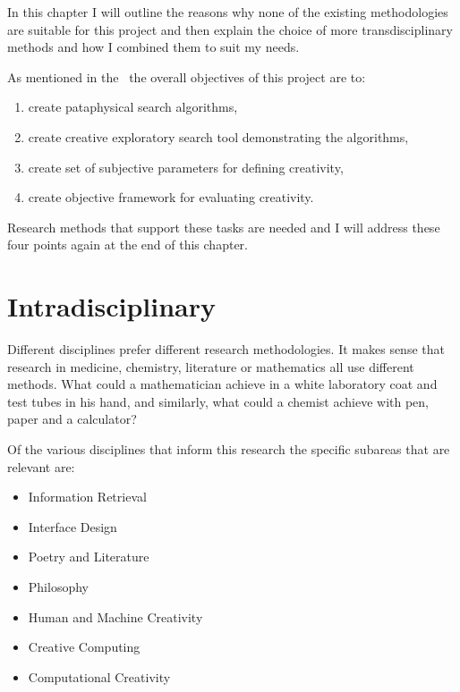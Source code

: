 In this chapter I will outline the reasons why none of the existing methodologies are suitable for this project and then explain the choice of more transdisciplinary methods and how I combined them to suit my needs.


As mentioned in the~ the overall objectives of this project are to:

\label{s:objectives}
\begin{enumerate}
  \item create pataphysical search algorithms,
  \item create creative exploratory search tool demonstrating the algorithms,
  \item create set of subjective parameters for defining creativity,
  \item create objective framework for evaluating creativity.
\end{enumerate}

Research methods that support these tasks are needed and I will address these four points again at the end of this chapter.


\section{Intradisciplinary}

Different disciplines prefer different research methodologies. It makes sense that research in medicine, chemistry, literature or mathematics all use different methods. What could a mathematician achieve in a white laboratory coat and test tubes in his hand, and similarly, what could a chemist achieve with pen, paper and a calculator?

Of the various disciplines that inform this research the specific subareas that are relevant are:

\begin{itemize}
  \item Information Retrieval
  \item Interface Design
  \item Poetry and Literature
  \item Philosophy
  \item Human and Machine Creativity
  \item Creative Computing
  \item Computational Creativity
\end{itemize}


